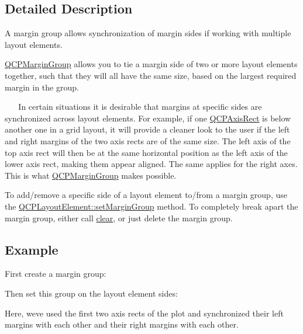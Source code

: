\subsection{Detailed Description}
A margin group allows synchronization of margin sides if working with multiple layout elements. 

\mbox{\hyperlink{class_q_c_p_margin_group}{Q\+C\+P\+Margin\+Group}} allows you to tie a margin side of two or more layout elements together, such that they will all have the same size, based on the largest required margin in the group.

~\newline
~\newline
 In certain situations it is desirable that margins at specific sides are synchronized across layout elements. For example, if one \mbox{\hyperlink{class_q_c_p_axis_rect}{Q\+C\+P\+Axis\+Rect}} is below another one in a grid layout, it will provide a cleaner look to the user if the left and right margins of the two axis rects are of the same size. The left axis of the top axis rect will then be at the same horizontal position as the left axis of the lower axis rect, making them appear aligned. The same applies for the right axes. This is what \mbox{\hyperlink{class_q_c_p_margin_group}{Q\+C\+P\+Margin\+Group}} makes possible.

To add/remove a specific side of a layout element to/from a margin group, use the \mbox{\hyperlink{class_q_c_p_layout_element_a516e56f76b6bc100e8e71d329866847d}{Q\+C\+P\+Layout\+Element\+::set\+Margin\+Group}} method. To completely break apart the margin group, either call \mbox{\hyperlink{class_q_c_p_margin_group_a144b67f216e4e86c3a3a309e850285fe}{clear}}, or just delete the margin group.\hypertarget{class_q_c_p_margin_group_QCPMarginGroup-example}{}\subsection{Example}\label{class_q_c_p_margin_group_QCPMarginGroup-example}
First create a margin group\+: 
\begin{DoxyCodeInclude}{0}
\end{DoxyCodeInclude}
Then set this group on the layout element sides\+: 
\begin{DoxyCodeInclude}{0}
\end{DoxyCodeInclude}
Here, we\textquotesingle{}ve used the first two axis rects of the plot and synchronized their left margins with each other and their right margins with each other. 

